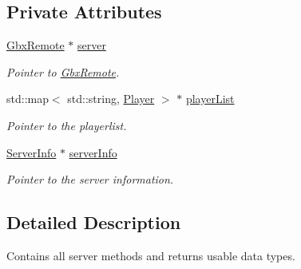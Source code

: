 \subsection*{Private Attributes}
\begin{DoxyCompactItemize}
\item 
\hypertarget{classMethods_a3236d275d78d0836cb633de4b1ab5dd8}{\hyperlink{classGbxRemote}{Gbx\-Remote} $\ast$ \hyperlink{classMethods_a3236d275d78d0836cb633de4b1ab5dd8}{server}}\label{classMethods_a3236d275d78d0836cb633de4b1ab5dd8}

\begin{DoxyCompactList}\small\item\em Pointer to \hyperlink{classGbxRemote}{Gbx\-Remote}. \end{DoxyCompactList}\item 
\hypertarget{classMethods_a2ffd93eb02b4b3e50359829f6aa229bd}{std\-::map$<$ std\-::string, \hyperlink{structPlayer}{Player} $>$ $\ast$ \hyperlink{classMethods_a2ffd93eb02b4b3e50359829f6aa229bd}{player\-List}}\label{classMethods_a2ffd93eb02b4b3e50359829f6aa229bd}

\begin{DoxyCompactList}\small\item\em Pointer to the playerlist. \end{DoxyCompactList}\item 
\hypertarget{classMethods_a8975019b5c58c62698ae2be1b777b5c9}{\hyperlink{structServerInfo}{Server\-Info} $\ast$ \hyperlink{classMethods_a8975019b5c58c62698ae2be1b777b5c9}{server\-Info}}\label{classMethods_a8975019b5c58c62698ae2be1b777b5c9}

\begin{DoxyCompactList}\small\item\em Pointer to the server information. \end{DoxyCompactList}\end{DoxyCompactItemize}


\subsection{Detailed Description}
Contains all server methods and returns usable data types. 

